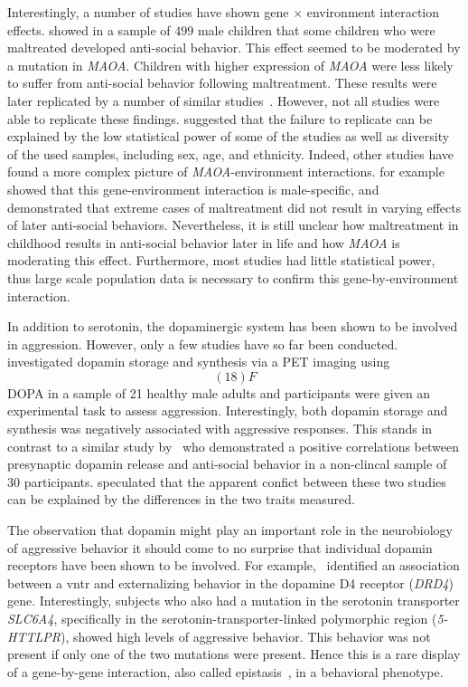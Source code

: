 Interestingly, a number of studies have shown gene $\times$ environment interaction effects.
\citet{Caspi2002} showed in a sample of $499$ male children that some children who were maltreated developed anti-social behavior.
This effect seemed to be moderated by a mutation in \textit{MAOA}.
Children with higher expression of \textit{MAOA} were less likely to suffer from anti-social behavior following maltreatment.
These results were later replicated by a number of similar studies~\cite{KimCohen2006}.
However, not all studies were able to replicate these findings.
\citet{Anholt2012} suggested that the failure to replicate can be explained by the low statistical power of some of the studies as well as diversity of the used samples, including sex, age, and ethnicity.
Indeed, other studies have found a more complex picture of \textit{MAOA}-environment interactions.
\citet{Huang2004} for example showed that this gene-environment interaction is male-specific, and~\citet{Weder2009} demonstrated that extreme cases of maltreatment did not result in varying effects of later anti-social behaviors.
Nevertheless, it is still unclear how maltreatment in childhood results in anti-social behavior later in life and how \textit{MAOA} is moderating this effect.
Furthermore, most studies had little statistical power,
thus large scale population data is necessary to confirm this gene-by-environment interaction.

In addition to serotonin, the dopaminergic system has been shown to be involved in aggression.
However, only a few studies have so far been conducted.
\citet{Schluter2013} investigated dopamin storage and synthesis via a PET imaging using \[(18)F\]DOPA in a sample of 21 healthy male adults and participants were given an experimental task to assess aggression.
Interestingly, both dopamin storage and synthesis was negatively associated with aggressive responses.
This stands in contrast to a similar study by~\citet{Buckholtz2010} who demonstrated a positive correlations between presynaptic dopamin release and anti-social behavior in a non-clincal sample of 30 participants. 
\citet{Rosell2015} speculated that the apparent confict between these two studies can be explained by the differences in the two traits measured.

The observation that dopamin might play an important role in the neurobiology of aggressive behavior it should come to no surprise that individual dopamin receptors have been shown to be involved.
For example,~\citet{Hohmann2009} identified an association between a \acrfull{vntr} and externalizing behavior in the dopamine D4 receptor (\textit{DRD4}) gene.
Interestingly, subjects who also had a mutation in the serotonin transporter \textit{SLC6A4}, specifically in the serotonin-transporter-linked polymorphic region (\textit{5-HTTLPR}), showed high levels of aggressive behavior.
This behavior was not present if only one of the two mutations were present.
Hence this is a rare display of a gene-by-gene interaction, also called epistasis~\cite{Anholt2012}, in a behavioral phenotype.



